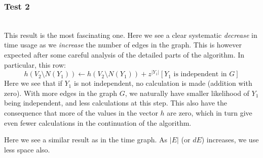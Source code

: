 \documentclass[a4paper, titlepage]{article}
\begin{document}
\subsubsection{Test 2}
\vspace{4mm}
\begin{center}
\\
This result is the most fascinating one. Here we see a clear systematic \emph{decrease} in time usage as we \emph{increase} the number of edges in the graph. This is however expected after some careful analysis of the detailed parts of the algorithm. In particular, this row:
$$
h(V_2 \setminus N(Y_1)) \leftarrow h(V_2 \setminus N(Y_1)) + z^{|Y_1|}[Y_1\text{ is independent in }G]
$$
Here we see that if $Y_1$ is not independent, no calculation is made (addition with zero). With more edges in the graph $G$, we naturally have smaller likelihood of $Y_1$ being independent, and less calculations at this step. This also have the consequence that more of the values in the vector $h$ are zero, which in turn give even fewer calculations in the continuation of the algorithm.
\\
\vspace{4mm}
\end{center}
Here we see a similar result as in the time graph. As $|E|$ (or $dE$) increases, we use less space also.
\end{document}
